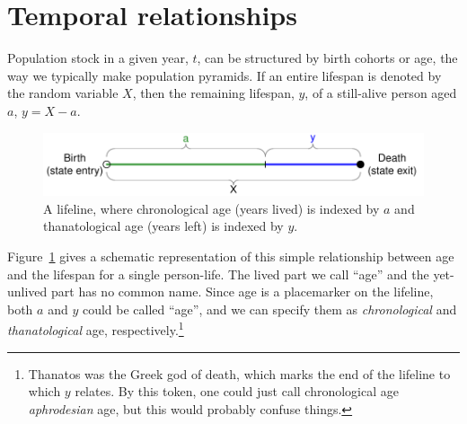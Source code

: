 \documentclass{article}
\begin{document}
\section*{Temporal relationships}


Population stock in a
 given year, $t$, can be structured by birth cohorts or age, the way we typically make 
 population pyramids. If an entire lifespan is denoted by the random variable
 $X$, then the remaining lifespan, $y$, of a still-alive person aged $a$, $y = X - a$.
\begin{figure}[h]
\centering
	\caption{A lifeline, where chronological age (years lived) is indexed by $a$
	and thanatological age (years left) is indexed by $y$.}
	\label{fig:line}
	\includegraphics[scale=.8]{Figures/LifeLine.pdf}	
\end{figure}
Figure~\ref{fig:line} gives a schematic representation of this simple
relationship between age and the lifespan for a single person-life. The lived
part we call ``age'' and the yet-unlived part has no common name. Since age is a
placemarker on the lifeline, both $a$ and $y$ could be called ``age'', and we
can specify them as \textit{chronological} and \textit{thanatological} age,
respectively.\footnote{Thanatos was the Greek god of death, which marks the end of the lifeline to which $y$ relates. By this token, one could just call chronological age \textit{aphrodesian} age, but this would probably confuse things.}
\end{document}
